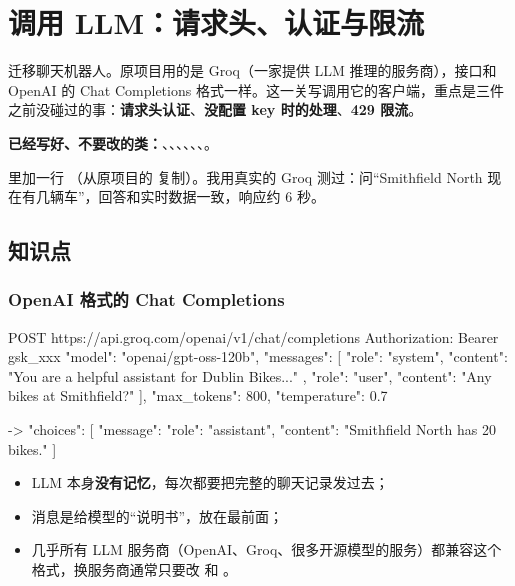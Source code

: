 \chapter{调用 LLM：请求头、认证与限流}

迁移聊天机器人。原项目用的是 Groq（一家提供 LLM 推理的服务商），接口和 OpenAI 的 Chat Completions 格式一样。这一关写调用它的客户端，重点是三件之前没碰过的事：\textbf{请求头认证}、\textbf{没配置 key 时的处理}、\textbf{429 限流}。


\textbf{已经写好、不要改的类：}、、、、、、。

\begin{note}
 里加一行 （从原项目的  复制）。我用真实的 Groq 测过：问“Smithfield North 现在有几辆车”，回答和实时数据一致，响应约 6 秒。
\end{note}

\section{知识点}

\subsection{OpenAI 格式的 Chat Completions}

\begin{jsoncode}
POST https://api.groq.com/openai/v1/chat/completions
Authorization: Bearer gsk_xxx
{
  "model": "openai/gpt-oss-120b",
  "messages": [
    { "role": "system", "content": "You are a helpful assistant for Dublin Bikes..." },
    { "role": "user",   "content": "Any bikes at Smithfield?" }
  ],
  "max_tokens": 800,
  "temperature": 0.7
}

-> { "choices": [ { "message": { "role": "assistant", "content": "Smithfield North has 20 bikes." } } ] }
\end{jsoncode}

\begin{itemize}
  \item LLM 本身\textbf{没有记忆}，每次都要把完整的聊天记录发过去；
  \item {} 消息是给模型的“说明书”，放在最前面；
  \item 几乎所有 LLM 服务商（OpenAI、Groq、很多开源模型的服务）都兼容这个格式，换服务商通常只要改  和 。
\end{itemize}

